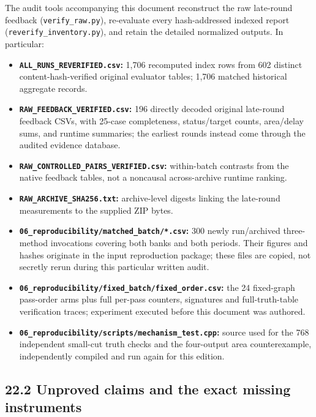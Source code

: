 The audit tools accompanying this document reconstruct the raw late-round feedback (\texttt{verify\_raw.py}), re-evaluate every hash-addressed indexed report (\texttt{reverify\_inventory.py}), and retain the detailed normalized outputs. In particular:

\begin{itemize}
\tightlist
\item
  \textbf{\texttt{ALL\_RUNS\_REVERIFIED.csv}:} 1,706 recomputed index rows from 602 distinct content-hash-verified original evaluator tables; 1,706 matched historical aggregate records.
\item
  \textbf{\texttt{RAW\_FEEDBACK\_VERIFIED.csv}:} 196 directly decoded original late-round feedback CSVs, with 25-case completeness, status/target counts, area/delay sums, and runtime summaries; the earliest rounds instead come through the audited evidence database.
\item
  \textbf{\texttt{RAW\_CONTROLLED\_PAIRS\_VERIFIED.csv}:} within-batch contrasts from the native feedback tables, not a noncausal across-archive runtime ranking.
\item
  \textbf{\texttt{RAW\_ARCHIVE\_SHA256.txt}:} archive-level digests linking the late-round measurements to the supplied ZIP bytes.
\item
  \textbf{\texttt{06\_reproducibility/matched\_batch/*.csv}:} 300 newly run/archived three-method invocations covering both banks and both periods. Their figures and hashes originate in the input reproduction package; these files are copied, not secretly rerun during this particular written audit.
\item
  \textbf{\texttt{06\_reproducibility/fixed\_batch/fixed\_order.csv}:} the 24 fixed-graph pass-order arms plus full per-pass counters, signatures and full-truth-table verification traces; experiment executed before this document was authored.
\item
  \textbf{\texttt{06\_reproducibility/scripts/mechanism\_test.cpp}:} source used for the 768 independent small-cut truth checks and the four-output area counterexample, independently compiled and run again for this edition.
\end{itemize}

\subsection{22.2 Unproved claims and the exact missing instruments}\label{unproved-claims-and-the-exact-missing-instruments}

